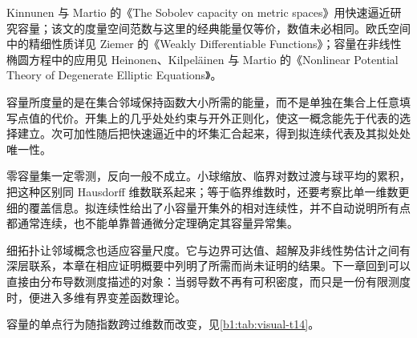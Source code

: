 \ProseParagraphBreak

Kinnunen 与 Martio 的《The Sobolev capacity on metric spaces》\cite{KinnunenMartio1996Capacity}用快速逼近研究容量；该文的度量空间范数与这里的经典能量仅等价，数值未必相同。欧氏空间中的精细性质详见 Ziemer 的《Weakly Differentiable Functions》\cite{Ziemer1989Weakly}；容量在非线性椭圆方程中的应用见 Heinonen、Kilpeläinen 与 Martio 的《Nonlinear Potential Theory of Degenerate Elliptic Equations》\cite{Heinonen2006Nonlinear}。






\begin{chaptersummary}
容量所度量的是在集合邻域保持函数大小所需的能量，而不是单独在集合上任意填写点值的代价。开集上的几乎处处约束与开外正则化，使这一概念能先于代表的选择建立。次可加性随后把快速逼近中的坏集汇合起来，得到拟连续代表及其拟处处唯一性。

\ProseParagraphBreak

零容量集一定零测，反向一般不成立。小球缩放、临界对数过渡与球平均的累积，把这种区别同 Hausdorff 维数联系起来；等于临界维数时，还要考察比单一维数更细的覆盖信息。拟连续性给出了小容量开集外的相对连续性，并不自动说明所有点都通常连续，也不能单靠普通微分定理确定其容量异常集。

\ProseParagraphBreak

细拓扑让邻域概念也适应容量尺度。它与边界可达值、超解及非线性势估计之间有深层联系，本章在相应证明概要中列明了所需而尚未证明的结果。下一章回到可以直接由分布导数测度描述的对象：当弱导数不再有可积密度，而只是一份有限测度时，便进入多维有界变差函数理论。
\end{chaptersummary}



容量的单点行为随指数跨过维数而改变，见\cref{b1:tab:visual-t14}。


\BookExercises



